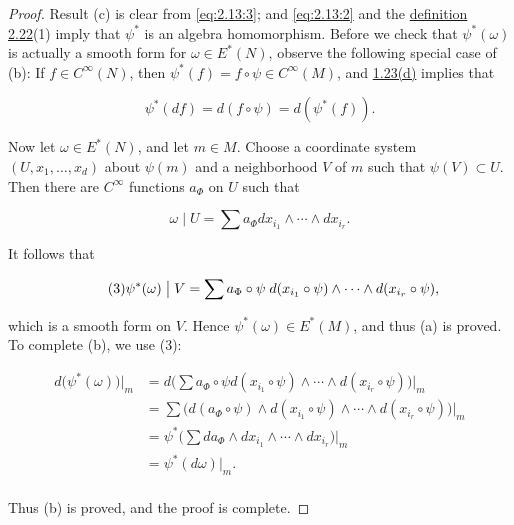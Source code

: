 \begin{proof}
Result (c) is clear from \eqref{eq:2.13:3}; and \eqref{eq:2.13:2} and the \hyperref[thm:2.22]{definition 2.22}(1) imply that $\psi^{*}$ is an algebra homomorphism. Before we check that $\psi^{*}(\omega)$ is actually a smooth form for $\omega\in E^{*}(N)$, observe the following special case of (b): If $f\in C^\infty(N)$, then $\psi^{*}(f)=f\circ\psi\in C^\infty(M)$, and \hyperref[thm:1.23]{1.23(d)} implies that

\begin{equation}
\tag{1}\label{eq:2.23:1}
\psi^{*}(d f)=d(f\circ\psi)=d(\psi^{*}(f)).
\end{equation}

Now let $\omega \in E^{*}(N)$, and let $m \in M$. Choose a coordinate system $(U, x_1, \ldots, x_d)$ about $\psi(m)$ and a neighborhood $V$ of $m$ such that $\psi(V) \subset U$. Then there are $C^\infty$ functions $a_\Phi$ on $U$ such that

\begin{equation}
\tag{2}\label{eq:2.23:2}
\omega\mid U=\sum a_{\Phi}d x_{i_{1}}\wedge\cdots\wedge d x_{i_{r}}.
\end{equation}

It follows that

\begin{equation}
\tag{3}\label{eq:2.23:3}
\psi^{*}(\omega)\bigm|V=\sum a_{\Phi}\circ\psi\;d(x_{i_{1}}\circ\psi)\wedge\dots\wedge d(x_{i_{r}}\circ\psi),
\end{equation}

which is a smooth form on $V$. Hence $\psi^{*}(\omega)\in E^{*}(M)$, and thus (a) is proved. To complete (b), we use (3):

\begin{equation}
\tag{4}\label{eq:2.23:4}
\begin{aligned}{d\big(\psi^{*}(\omega)\big)\big|_{m}}&{{}=d\big(\textstyle\sum a_{\Phi}\circ\psi d(x_{i_{1}}\circ\psi)\wedge\cdots\wedge d(x_{i_{r}}\circ\psi)\big)\big|_{m}}\\ {}&{{}=\textstyle\sum\big(d(a_{\Phi}\circ\psi)\wedge d(x_{i_{1}}\circ\psi)\wedge\cdots\wedge d(x_{i_{r}}\circ\psi)\big)\big|_{m}}\\ {}&{{}=\psi^{*}(\textstyle\sum d a_{\Phi}\wedge d x_{i_{1}}\wedge\cdots\wedge d x_{i_{r}}\big)\big|_{m}}\\ {}&{{}=\psi^{*}(d\omega)\big|_{m}.}\\ \end{aligned}
\end{equation}

Thus (b) is proved, and the proof is complete.

\end{proof}

